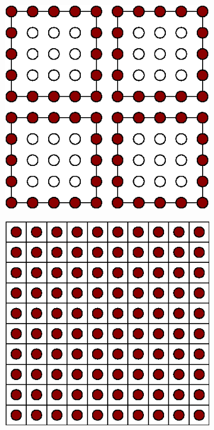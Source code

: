 \documentclass[asi,article,submit,moreauthors]{Definitions/mdpi}
\begin{document}
\begin{figure}[htbp!]
    \centering
    \captionsetup[subfigure]{justification=centering}
    \begin{subfigure}[c]{0.49\textwidth}
        \centering
        \includegraphics[]{Figs/Theory/dg-2d-shared_dofs.eps}
        \caption{}
        \label{fig:dg-2d-shared_dofs}
    \end{subfigure}
    \hfill
    \begin{subfigure}[c]{0.49\textwidth}
        \centering
        \includegraphics[]{Figs/Theory/fv-2d-shared_dofs.eps}

\end{subfigure}
\end{figure}
\end{document}
